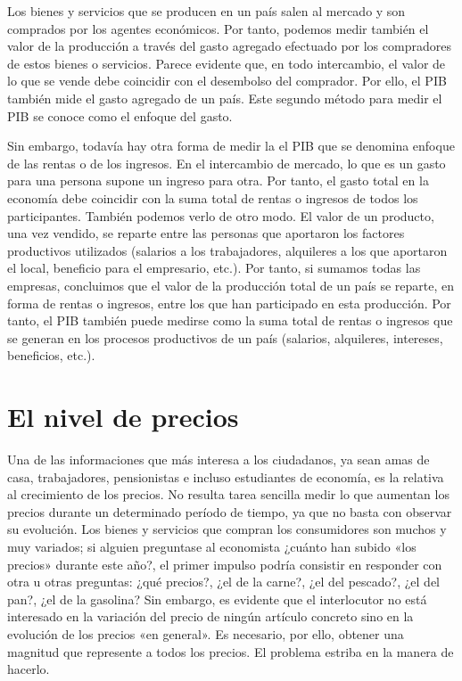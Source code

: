 \documentclass[
]{krantz}
\begin{document}
Los bienes y servicios que se producen en un país salen al mercado y son comprados por los agentes económicos. Por tanto, podemos medir también el valor de la producción a través del gasto agregado efectuado por los compradores de estos bienes o servicios. Parece evidente que, en todo intercambio, el valor de lo que se vende debe coincidir con el desembolso del comprador. Por ello, el PIB también mide el gasto agregado de un país. Este segundo método para medir el PIB se conoce como el enfoque del gasto.

Sin embargo, todavía hay otra forma de medir la el PIB que se denomina enfoque de las rentas o de los ingresos. En el intercambio de mercado, lo que es un gasto para una persona supone un ingreso para otra. Por tanto, el gasto total en la economía debe coincidir con la suma total de rentas o ingresos de todos los participantes. También podemos verlo de otro modo. El valor de un producto, una vez vendido, se reparte entre las personas que aportaron los factores productivos utilizados (salarios a los trabajadores, alquileres a los que aportaron el local, beneficio para el empresario, etc.). Por tanto, si sumamos todas las empresas, concluimos que el valor de la producción total de un país se reparte, en forma de rentas o ingresos, entre los que han participado en esta producción. Por tanto, el PIB también puede medirse como la suma total de rentas o ingresos que se generan en los procesos productivos de un país (salarios, alquileres, intereses, beneficios, etc.).

\hypertarget{el-nivel-de-precios}{%
\section{El nivel de precios}\label{el-nivel-de-precios}}

Una de las informaciones que más interesa a los ciudadanos, ya sean amas de casa, trabajadores, pensionistas e incluso estudiantes de economía, es la relativa al crecimiento de los precios. No resulta tarea sencilla medir lo que aumentan los precios durante un determinado período de tiempo, ya que no basta con observar su evolución. Los bienes y servicios que compran los consumidores son muchos y muy variados; si alguien preguntase al economista ¿cuánto han subido «los precios» durante este año?, el primer impulso podría consistir en responder con otra u otras preguntas: ¿qué precios?, ¿el de la carne?, ¿el del pescado?, ¿el del pan?, ¿el de la gasolina? Sin embargo, es evidente que el interlocutor no está interesado en la variación del precio de ningún artículo concreto sino en la evolución de los precios «en general». Es necesario, por ello, obtener una magnitud que represente a todos los precios. El problema estriba en la manera de hacerlo.
\end{document}

